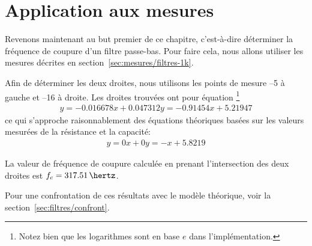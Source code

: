 \section{Application aux mesures}

Revenons maintenant au but premier de ce chapitre,
c'est-à-dire déterminer la fréquence de coupure d'un filtre passe-bas.
Pour faire cela, nous allons utiliser les mesures décrites en
section~\ref{sec:mesures/filtres-1k}.

Afin de déterminer les deux droites, nous utilisons les points de mesure
--5 à gauche et --16 à droite.
Les droites trouvées ont pour équation%
\footnote{
    Notez bien que les logarithmes sont en base $e$ dans l'implémentation.
}
\begin{equation}
    \begin{array}{rcl}
        y = -0.016678x+0.047312
        y = -0.91454x+5.21947
    \end{array}
\end{equation}
ce qui s'approche raisonnablement des équations théoriques basées sur 
les valeurs mesurées de la résistance et la capacité:
\begin{equation}
    \begin{array}{rcl}
        y = 0x+0
        y = -x+5.8219
    \end{array}
\end{equation}

La valeur de fréquence de coupure calculée
en prenant l'intersection des deux droites est $f_c=317.51\,\hertz$.

Pour une confrontation de ces résultats avec le modèle théorique,
voir la section~\ref{sec:filtres/confront}.
